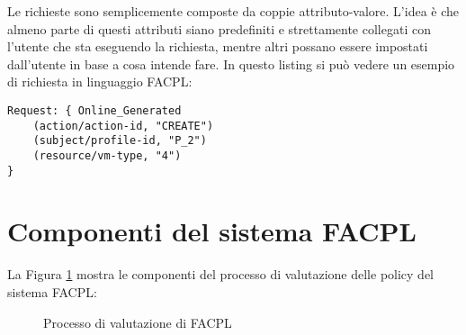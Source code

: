 Le richieste sono semplicemente composte da coppie attributo-valore. L'idea è che almeno parte di questi attributi siano predefiniti e strettamente collegati con l'utente che sta eseguendo la richiesta, mentre altri possano essere impostati dall'utente in base a cosa intende fare. In questo listing si può vedere un esempio di richiesta in linguaggio FACPL:
\begin{lstlisting}[xleftmargin=1em, label={code:requestFacpl}, caption={Esempio di richiesta in FACPL}, language=FACPL, basicstyle=\fontsize{9.5}{10}\ttfamily]
Request: { Online_Generated
    (action/action-id, "CREATE")
    (subject/profile-id, "P_2")
    (resource/vm-type, "4")
}
\end{lstlisting} 
\section{Componenti del sistema FACPL}
\label{sec:componentiFACPL}
La Figura \ref{fig:facplEvaluationProcess} mostra le componenti del processo di valutazione delle policy del sistema FACPL:
\begin{figure}[h]
    \centering
    
    \caption{Processo di valutazione di FACPL}
    \label{fig:facplEvaluationProcess}
\end{figure}
